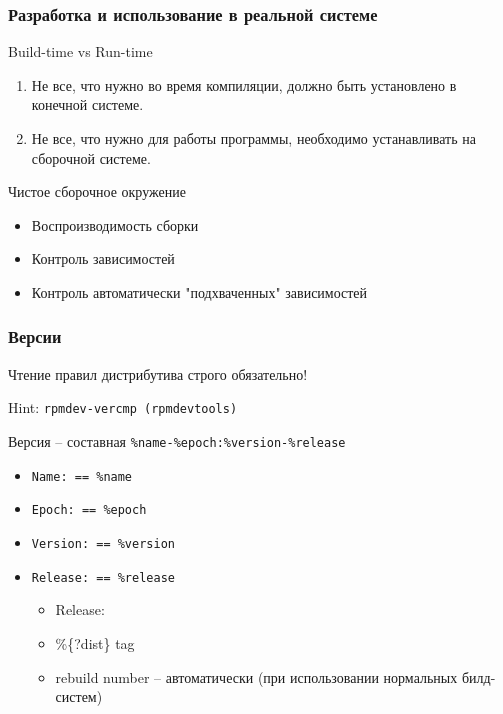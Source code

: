 \begin{frame}
	\frametitle{Разработка и использование в реальной системе}
	
	\begin{block}{Build-time vs Run-time}

		\begin{enumerate}
			\item Не все, что нужно во время компиляции, должно быть установлено в конечной системе.
			\item Не все, что нужно для работы программы, необходимо устанавливать на сборочной системе.
		\end{enumerate}
	\end{block}
	\begin{block}{Чистое сборочное окружение}
		\begin{itemize}
			\item Воспроизводимость сборки 
			\item Контроль зависимостей
			\item Контроль автоматически "подхваченных" зависимостей
		\end{itemize}
	\end{block}
\end{frame}

\begin{frame}
	\frametitle{Версии}

	\Large{Чтение правил дистрибутива строго обязательно!}
	
	Hint: {\tt rpmdev-vercmp (rpmdevtools)}
	\begin{block}{ Версия -- составная}
		{\tt \%name-\%epoch:\%version-\%release}
		\begin{itemize}
			\item {\tt Name: == \%name}
			\item {\tt Epoch: == \%epoch}
			\item {\tt Version: == \%version}
			\item {\tt Release: == \%release}
			\begin{itemize}
				\item Release:
				\item \%\{?dist\} tag
				\item rebuild number -- автоматически (при использовании нормальных билд-систем)
			\end{itemize}
		\end{itemize}
	\end{block}

\end{frame}


